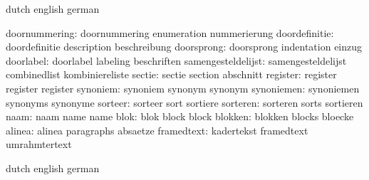 
\startsetupvariables  dutch                english             german

      doornummering:  doornummering        enumeration         nummerierung
      doordefinitie:  doordefinitie        description         beschreibung
         doorsprong:  doorsprong           indentation         einzug
          doorlabel:  doorlabel            labeling            beschriften
 samengesteldelijst:  samengesteldelijst   combinedlist        kombiniereliste
             sectie:  sectie               section             abschnitt
           register:  register             register            register
           synoniem:  synoniem             synonym             synonym
         synoniemen:  synoniemen           synonyms            synonyme
            sorteer:  sorteer              sort                sortiere
           sorteren:  sorteren             sorts               sortieren
               naam:  naam                 name                name
               blok:  blok                 block               block
            blokken:  blokken              blocks              bloecke
             alinea:  alinea               paragraphs          absaetze
         framedtext:  kadertekst           framedtext          umrahmtertext

\stopsetupvariables




\startelements        dutch                english             german

